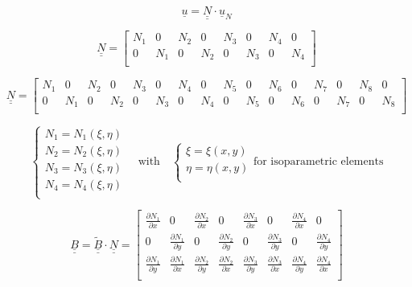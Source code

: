 \documentclass[a4paper]{jpconf}
\begin{document}
\begin{equation}
\underline{u}=\underline{\underline{N}}\cdot\underline{u}_{N}
\end{equation}

\begin{equation}
\underline{\underline{N}}=\begin{bmatrix}
N_{1}&0&N_{2}&0&N_{3}&0&N_{4}&0\\
0&N_{1}&0&N_{2}&0&N_{3}&0&N_{4}\\
\end{bmatrix}
\end{equation}

\setcounter{MaxMatrixCols}{20}
\begin{equation}
\underline{\underline{N}}=\begin{bmatrix}
N_{1} & 0     & N_{2} & 0     & N_{3} & 0     & N_{4} & 0     & N_{5} & 0     & N_{6} & 0     & N_{7} & 0     & N_{8} & 0    \\
0     & N_{1} & 0     & N_{2} & 0     & N_{3} & 0     & N_{4} & 0     & N_{5} & 0     & N_{6} & 0     & N_{7} & 0     & N_{8} \\
\end{bmatrix}
\end{equation}


\begin{equation}
\begin{cases}
N_{1}=N_{1}\left(\xi,\eta\right)\\
N_{2}=N_{2}\left(\xi,\eta\right)\\
N_{3}=N_{3}\left(\xi,\eta\right)\\
N_{4}=N_{4}\left(\xi,\eta\right)\\
\end{cases}\quad\text{with}\quad\begin{cases}
\xi=\xi\left(x,y\right)\\
\eta=\eta\left(x,y\right)\\
\end{cases}\text{for isoparametric elements}
\end{equation}

\begin{equation}
\underline{\underline{B}}=\underline{\underline{\widetilde{B}}}\cdot\underline{\underline{N}}=\begin{bmatrix}
\frac{\partial N_{1}}{\partial x}&0&\frac{\partial N_{2}}{\partial x}&0&\frac{\partial N_{3}}{\partial x}&0&\frac{\partial N_{4}}{\partial x}&0\\[7.5pt]
0&\frac{\partial N_{1}}{\partial y}&0&\frac{\partial N_{2}}{\partial y}&0&\frac{\partial N_{3}}{\partial y}&0&\frac{\partial N_{4}}{\partial y}\\[7.5pt]
\frac{\partial N_{1}}{\partial y}&\frac{\partial N_{1}}{\partial x}&\frac{\partial N_{2}}{\partial y}&\frac{\partial N_{2}}{\partial x}&\frac{\partial N_{3}}{\partial y}&\frac{\partial N_{3}}{\partial x}&\frac{\partial N_{4}}{\partial y}&\frac{\partial N_{4}}{\partial x}\\
\end{bmatrix}
\end{equation}
\end{document}
